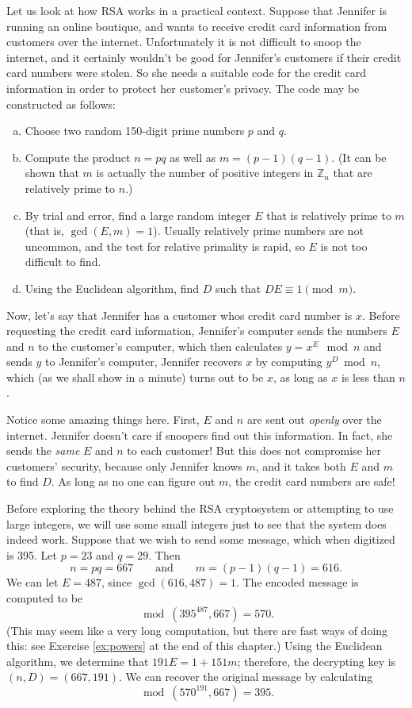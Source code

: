 Let us look at how RSA works in a practical context.  
Suppose that Jennifer is running an online boutique, and wants to receive
 credit card information from customers over the internet. Unfortunately it is not difficult to snoop the internet, 
and it certainly wouldn't be good for Jennifer's customers if their credit card numbers were stolen. 
So she needs a suitable code for the credit card information in order to protect her customer's privacy.
The code may be constructed as follows:
\begin{enumerate}[(a)]
\item 
Choose  two random 150-digit prime
numbers $p$ and $q$. 
\item
Compute the product $n= pq$ as well as $ m = (p - 1)(q-1)$. 
(It can be shown that $m$ is actually the number of positive integers in $\mathbb{Z}_n$ that are relatively prime to $n$.)    
\item
By trial and error, find a large random integer $E$ that is relatively prime to $m$  (that is, $\gcd(E, m) = 1$). Usually
relatively prime numbers are not uncommon, and the test for relative primality is rapid, so $E$ is not too difficult to find.  
\item
Using the Euclidean algorithm, find $D$ such that \mbox{$DE \equiv 1 \pmod{m}$}. 
\end{enumerate}
 Now, let's say that Jennifer has a  customer whos credit card number is $x$.  Before requesting the credit card information, Jennifer's computer  sends the numbers  $E$ and $n$ to the customer's computer, which then calculates $y = x^E \mod n$ and sends $y$ to
Jennifer's computer, Jennifer recovers $x$ by computing  $y^D \bmod
n$, which (as we shall show in a minute) turns out to be $x$, as long as $x$ is less than $n$. 

Notice some amazing things here. First, $E$ and $n$ are sent out \emph{openly} over the internet. Jennifer doesn't care if  snoopers find out this information. In fact, she sends the \emph{same} $E$ and $n$ to each customer! But this does not compromise her customers' security, because only Jennifer knows $m$, and it takes both $E$ and $m$ to find $D$. As long as no one can figure out $m$, the credit card numbers are safe!

 
\vspace{2 ex}
 
 
\begin{example}
Before exploring the theory behind the RSA cryptosystem or attempting
to use large integers, we will use some small integers just to see
that the system does indeed work. Suppose that we wish to send some
message, which when digitized is 395. Let $p = 23$ and $q = 29$.  Then 
$$ n = pq = 667 \qquad \textrm{and} \qquad
m = (p - 1)(q - 1) = 616.
$$
We can let $E = 487$, since $\gcd(616, 487) = 1$. The encoded message
is computed to be  
$$
\bmod(395^{487},  667) = 570.
$$
(This may seem like a very long computation, but there are fast ways of doing this: see Exercise \ref{ex:powers} at the end of this chapter.)
Using the Euclidean
algorithm, we determine that $191 E = 1 + 151 m$; therefore, the
decrypting key is $(n, D) = ( 667, 191)$. We can recover the original 
message by calculating  
$$
 \bmod(570^{191}, 667) = 395.
$$
\end{example}
 
